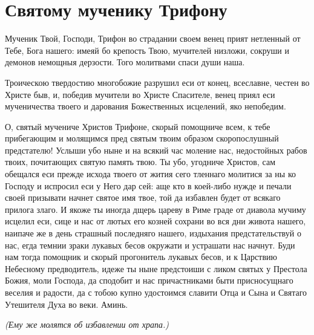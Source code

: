 \mychapterending


 
\section{Святому мученику Трифону}\begin{mymulticols}
 


Мученик Твой, Господи, Трифон во страдании своем венец прият нетленный от Тебе, Бога нашего: имеяй бо крепость Твою, мучителей низложи, сокруши и демонов немощныя дерзости. Того молитвами спаси души наша.


Троическою твердостию многобожие разрушил еси от конец, всеславне, честен во Христе быв, и, победив мучители во Христе Спасителе, венец приял еси мученичества твоего и дарования Божественных исцелений, яко непобедим.


О, святый мучениче Христов Трифоне, скорый помощниче всем, к тебе прибегающим и молящимся пред святым твоим образом скоропослушный предстателю! Услыши убо ныне и на всякий час моление нас, недостойных рабов твоих, почитающих святую память твою. Ты убо, угодниче Христов, сам обещался еси прежде исхода твоего от жития сего тленнаго молитися за ны ко Господу и испросил еси у Него дар сей: аще кто в коей-либо нужде и печали своей призывати начнет святое имя твое, той да избавлен будет от всякаго прилога злаго. И якоже ты иногда дщерь цареву в Риме граде от диавола мучиму исцелил еси, сице и нас от лютых его козней сохрани во вся дни живота нашего, наипаче же в день страшный последняго нашего, издыхания предстательствуй о нас, егда темнии зраки лукавых бесов окружати и устрашати нас начнут. Буди нам тогда помощник и скорый прогонитель лукавых бесов, и к Царствию Небесному предводитель, идеже ты ныне предстоиши с ликом святых у Престола Божия, моли Господа, да сподобит и нас причастниками быти присносущнаго веселия и радости, да с тобою купно удостоимся славити Отца и Сына и Святаго Утешителя Духа во веки. Аминь.

\itshape (Ему же молятся об избавлении от храпа.)\normalfont{}

\end{mymulticols}

